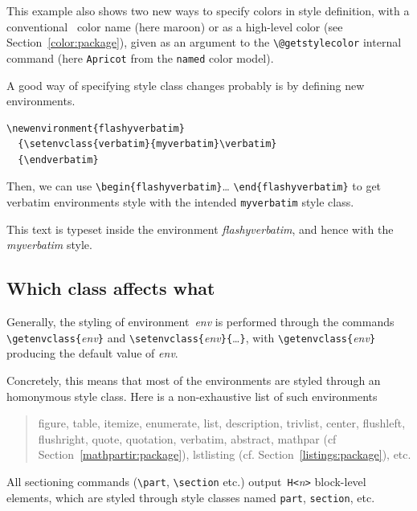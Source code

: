 This example also shows two new ways to specify colors in style
definition, with a
conventional \html~color name (here {\ifhevea\maroon\fi maroon}) or as
a high-level color (see Section~\ref{color:package}), given as an argument to
the \verb+\@getstylecolor+ internal command
(here \colorbox{abricot}{\texttt{Apricot}} from the \texttt{named} color model).

A good way of specifying style class changes probably is by defining
new environments.
\begin{verbatim}
\newenvironment{flashyverbatim}
  {\setenvclass{verbatim}{myverbatim}\verbatim}
  {\endverbatim}
\end{verbatim}
\newenvironment{flashyverbatim}
  {\setenvclass{verbatim}{myverbatim}\verbatim}
  {\endverbatim}%
Then, we can use \verb+\begin{flashyverbatim}+\ldots{}
\verb+\end{flashyverbatim}+ to get verbatim environments style with
the intended \texttt{myverbatim} style class.
\begin{htmlonly}\begin{flashyverbatim}
This text is typeset inside the environment
\emph{flashyverbatim}, and hence with the \emph{myverbatim}
style.
\end{flashyverbatim}
\end{htmlonly}

\subsection{Which class affects\label{whatclass} what}

Generally, the styling of environment~\textit{env} is performed through
the commands
\verb+\getenvclass{+\textit{env}\verb+}+
and \verb+\setenvclass{+\textit{env}\verb+}{+\ldots\verb+}+,
with \verb+\getenvclass{+\textit{env}\verb+}+ producing the
default value of \textit{env}.

Concretely, this means that most of the environments are styled through
an homonymous style class. Here is a non-exhaustive list of such
environments
\begin{quote}
figure, table, itemize, enumerate, list, description, 
trivlist, center, flushleft, flushright, quote,
quotation, verbatim, abstract, mathpar (cf
Section~\ref{mathpartir:package}), lstlisting
(cf. Section~\ref{listings:package}), etc.
\end{quote}

All sectioning commands (\verb+\part+, \verb+\section+ etc.)
output~\verb+H<+\textit{n}\verb+>+ block-level  elements, which are styled
through style classes named \texttt{part}, \texttt{section}, etc.

